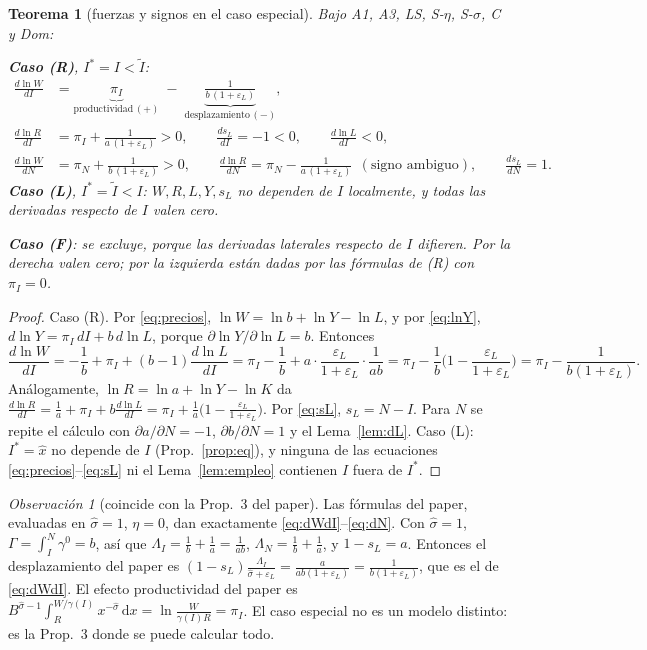 \documentclass[11pt,a4paper]{article}
\numberwithin{equation}{section}
\theoremstyle{definition}
\theoremstyle{plain}
\newtheorem{teorema}[definicion]{Teorema}
\theoremstyle{remark}
\newtheorem{observacion}[definicion]{Observación}
\newcommand{\It}{\tilde I}
\newcommand{\Is}{I^{*}}
\newcommand{\eps}{\varepsilon}
\newcommand{\dd}{\,\mathrm{d}}
\newcommand{\sh}{\hat\sigma}
\begin{document}
\begin{teorema}[fuerzas y signos en el caso especial]\label{thm:fuerzas}
Bajo \textsf{A1}, \textsf{A3}, \textsf{LS}, \textsf{S-$\eta$}, \textsf{S-$\sigma$}, \textsf{C} y \textsf{Dom}:

\smallskip\noindent\textbf{Caso (R)}, $\Is=I<\It$:
\begin{align}
  \frac{d\ln W}{dI}&=\underbrace{\pi_I}_{\text{productividad}\,(+)}\;-\;\underbrace{\frac{1}{b\,(1+\eps_L)}}_{\text{desplazamiento}\,(-)}, \label{eq:dWdI}\\
  \frac{d\ln R}{dI}&=\pi_I+\frac{1}{a\,(1+\eps_L)}>0,\qquad
  \frac{ds_L}{dI}=-1<0,\qquad \frac{d\ln L}{dI}<0,\label{eq:dRdI}\\
  \frac{d\ln W}{dN}&=\pi_N+\frac{1}{b\,(1+\eps_L)}>0,\qquad
  \frac{d\ln R}{dN}=\pi_N-\frac{1}{a\,(1+\eps_L)}\ \ (\text{signo ambiguo}),\qquad \frac{ds_L}{dN}=1. \label{eq:dN}
\end{align}
\textbf{Caso (L)}, $\Is=\It<I$: $W,R,L,Y,s_L$ no dependen de $I$ localmente, y todas las derivadas respecto de $I$
valen cero.

\noindent\textbf{Caso (F)}: se excluye, porque las derivadas laterales respecto de $I$ difieren. Por la derecha
valen cero; por la izquierda están dadas por las fórmulas de (R) con $\pi_I=0$.
\end{teorema}
\begin{proof}
Caso (R). Por \eqref{eq:precios}, $\ln W=\ln b+\ln Y-\ln L$, y por \eqref{eq:lnY},
$d\ln Y=\pi_I\,dI+b\,d\ln L$, porque $\partial\ln Y/\partial\ln L=b$. Entonces
\[
  \frac{d\ln W}{dI}=-\frac1b+\pi_I+(b-1)\frac{d\ln L}{dI}
  =\pi_I-\frac1b+a\cdot\frac{\eps_L}{1+\eps_L}\cdot\frac{1}{ab}
  =\pi_I-\frac{1}{b}\Big(1-\frac{\eps_L}{1+\eps_L}\Big)=\pi_I-\frac{1}{b(1+\eps_L)}.
\]
Análogamente, $\ln R=\ln a+\ln Y-\ln K$ da $\frac{d\ln R}{dI}=\frac1a+\pi_I+b\frac{d\ln L}{dI}=\pi_I+\frac1a\big(1-\frac{\eps_L}{1+\eps_L}\big)$.
Por \eqref{eq:sL}, $s_L=N-I$. Para $N$ se repite el cálculo con $\partial a/\partial N=-1$, $\partial b/\partial N=1$
y el Lema~\ref{lem:dL}. Caso (L): $\Is=\hat x$ no depende de $I$ (Prop.~\ref{prop:eq}), y ninguna de las ecuaciones
\eqref{eq:precios}–\eqref{eq:sL} ni el Lema~\ref{lem:empleo} contienen $I$ fuera de $\Is$.
\end{proof}

\begin{observacion}[coincide con la Prop.~3 del paper]\label{obs:coincide}
Las fórmulas del paper, evaluadas en $\sh=1$, $\eta=0$, dan exactamente \eqref{eq:dWdI}–\eqref{eq:dN}. Con
$\sh=1$, $\Gamma=\int_I^N\gamma^0=b$, así que $\Lambda_I=\frac1b+\frac1a=\frac{1}{ab}$, $\Lambda_N=\frac1b+\frac1a$, y
$1-s_L=a$. Entonces el desplazamiento del paper es
$(1-s_L)\frac{\Lambda_I}{\sh+\eps_L}=\frac{a}{ab(1+\eps_L)}=\frac{1}{b(1+\eps_L)}$, que es el de \eqref{eq:dWdI}.
El efecto productividad del paper es $B^{\sh-1}\int_R^{W/\gamma(I)}x^{-\sh}\dd x=\ln\frac{W}{\gamma(I)R}=\pi_I$. El
caso especial no es un modelo distinto: es la Prop.~3 donde se puede calcular todo.
\end{observacion}
\end{document}
